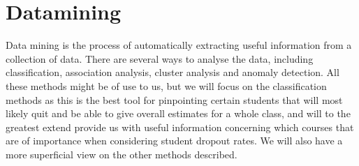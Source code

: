 \section{Datamining}
Data mining is the process of automatically extracting useful information from a collection of data. There are several ways to analyse the data, including classification, association analysis, cluster analysis and anomaly detection. All these methods might be of use to us, but we will focus on the classification methods as this is the best tool for pinpointing certain students that will most likely quit and be able to give overall estimates for a whole class, and will to the greatest extend provide us with useful information concerning which courses that are of importance when considering student dropout rates. We will also have a more superficial view on the other methods described.





